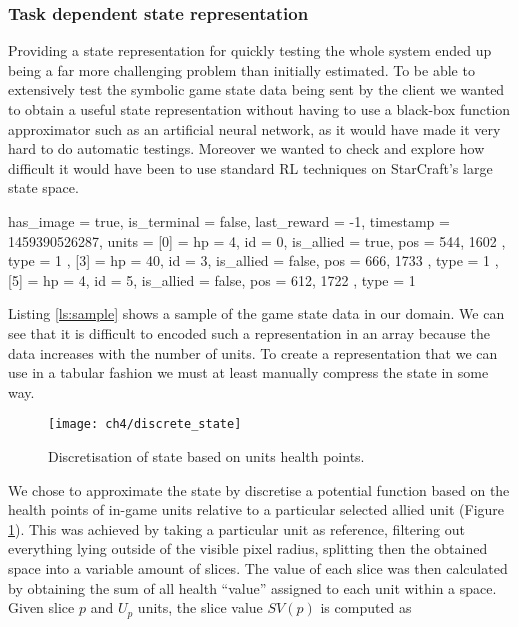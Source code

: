 \subsubsection{Task dependent state representation}

Providing a state representation for quickly testing the whole system ended up
being a far more challenging problem than initially estimated. To be able to
extensively test the symbolic game state data being sent by the client we wanted
to obtain a useful state representation without having to use a black-box
function approximator such as an artificial neural network, as it would have
made it very hard to do automatic testings. Moreover we wanted to check and
explore how difficult it would have been to use standard RL techniques on
StarCraft's large state space.

\begin{sflisting}[caption=Example of a game state Lua table recorded by the
  agent, label=ls:sample] [standard]
{
  has_image = true,
  is_terminal = false,
  last_reward = -1,
  timestamp = 1459390526287,
  units = {
    [0] = {
      hp = 4,
      id = 0,
      is_allied = true,
      pos = { 544, 1602 },
      type = 1
    },
    [3] = {
      hp = 40,
      id = 3,
      is_allied = false,
      pos = { 666, 1733 },
      type = 1
    },
    [5] = {
      hp = 4,
      id = 5,
      is_allied = false,
      pos = { 612, 1722 },
      type = 1
    }
  }
}

\end{sflisting}

Listing \ref{ls:sample} shows a sample of the game state data in our domain. We
can see that it is difficult to encoded such a representation in an array because
the data increases with the number of units. To create a representation that we
can use in a tabular fashion we must at least manually compress the state in
some way.

\begin{figure}[h]
    \centering
    \texttt{[image: ch4/discrete\_state]}
    \caption{Discretisation of state based on units health points.}
    \label{fig:discrete_state}
\end{figure}

We chose to approximate the state by discretise a potential function
\citep{thrun2005probabilistic} based on the health points of in-game units
relative to a particular selected allied unit (Figure \ref{fig:discrete_state}).
This was achieved by taking a particular unit as reference, filtering out
everything lying outside of the visible pixel radius, splitting then the
obtained space into a variable amount of slices. The value of each slice was
then calculated by obtaining the sum of all health ``value'' assigned to each
unit within a space. Given slice $p$ and $U_p$ units, the slice value $SV(p)$ is
computed as

